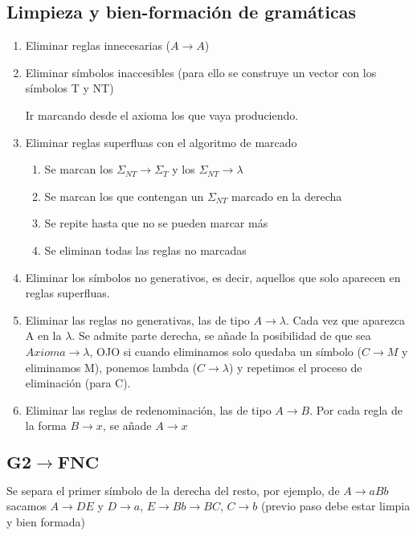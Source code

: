 \documentclass[12pt, twoside, openright]{report} %
\begin{document}
\subsection{Limpieza y bien-formación de gramáticas}
\begin{enumerate}
	\item Eliminar reglas innecesarias ($A \rightarrow A$)
	\item Eliminar símbolos inaccesibles (para ello se construye un vector con los símbolos T y NT)

	      Ir marcando desde el axioma los que vaya produciendo.
	\item Eliminar reglas superfluas con el algoritmo de marcado
	      \begin{enumerate}
		      \item Se marcan los $\Sigma_{NT} \rightarrow \Sigma_{T}$ y los $\Sigma_{NT} \rightarrow \lambda$
		      \item Se marcan los que contengan un $\Sigma_{NT}$ marcado en la derecha
		      \item Se repite hasta que no se pueden marcar más
		      \item Se eliminan todas las reglas no marcadas
	      \end{enumerate}
	\item Eliminar los símbolos no generativos, es decir, aquellos que solo aparecen en reglas superfluas.
	\item Eliminar las reglas no generativas, las de tipo $A \rightarrow \lambda$. Cada vez que aparezca A en la $\lambda$. Se admite parte derecha, se añade la posibilidad de que sea $\textit{Axioma} \rightarrow \lambda$, OJO si cuando eliminamos solo quedaba un símbolo ($C \rightarrow M$ y eliminamos M), ponemos lambda ($C \rightarrow \lambda$) y repetimos el proceso de eliminación (para C).
	\item Eliminar las reglas de redenominación, las de tipo $A \rightarrow B$. Por cada regla de la forma $B \rightarrow x$, se añade $A \rightarrow x$
\end{enumerate}

\subsection{$\boldsymbol{G2 \rightarrow FNC}$}
Se separa el primer símbolo de la derecha del resto, por ejemplo, de $A \rightarrow aBb$ sacamos $A \rightarrow DE$ y $D \rightarrow a$, $E \rightarrow Bb \rightarrow BC$, $C \rightarrow b$ (previo paso debe estar limpia y bien formada)
\end{document}

